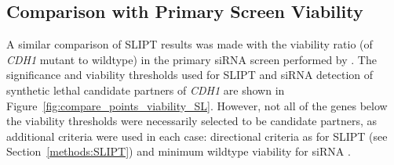 \begin{table}[!htb]
\caption{\Gls{ANOVA} for Synthetic Lethality and Correlation with \textit{CDH1}}
\label{tab:compare_correlation_SL}
\noindent{}
\end{table} 

\FloatBarrier

\subsection{Comparison with Primary Screen Viability} \label{chapt3:compare_viability}

A similar comparison of \gls{SLIPT} results was made with the viability ratio (of \textit{CDH1} \gls{mutant} to wildtype) in the primary \gls{siRNA} screen performed by \citet{Telford2015}. The significance and viability thresholds used for \gls{SLIPT} and \gls{siRNA} detection of \gls{synthetic lethal} candidate partners of \textit{CDH1} are shown in Figure~\ref{fig:compare_points_viability_SL}. However, not all of the genes below the viability  thresholds were necessarily selected to be candidate partners, as additional criteria were used in each case: directional criteria as for \gls{SLIPT} (see Section~\ref{methods:SLIPT}) and minimum wildtype viability for \gls{siRNA} \citep{Telford2015}.

